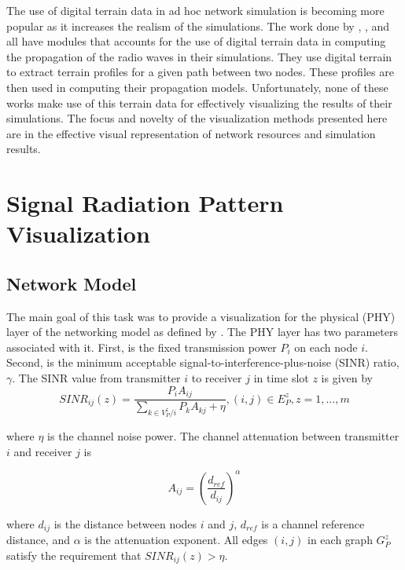 The use of digital terrain data in ad hoc network simulation is becoming more popular as it increases the realism of the simulations.  The work done by \cite{LuiPerNic01}, \cite{BonWanSta98}, and \cite{DzaTraFil07} all have modules that accounts for the use of digital terrain data in computing the propagation of the radio waves in their simulations.  They use digital terrain to extract terrain profiles for a given path between two nodes.  These profiles are then used in computing their propagation models.  Unfortunately, none of these works make use of this terrain data for effectively visualizing the results of their simulations.  The focus and novelty of the visualization methods presented here are in the effective visual representation of network resources and simulation results.


\section{Signal Radiation Pattern Visualization}
\subsection{Network Model}
The main goal of this task was to provide a visualization for the physical (PHY) layer of the networking model as defined by \cite{WuChoQia05}.  The PHY layer has two parameters associated with it.  First, is the fixed transmission power $P_i$ on each node $i$.  Second, is the minimum acceptable signal-to-interference-plus-noise (SINR) ratio, $\gamma$.  The SINR value from transmitter $i$ to receiver $j$ in time slot $z$ is given by
\begin{equation}
SINR_{ij}(z) = \frac{P_i A_{ij}}{\sum_{k \in V_P^z / i} P_k A_{k j} + \eta } , (i, j) \in E_P^z , z = 1,...,m
\end{equation} 

where $\eta$ is the channel noise power.  The channel attenuation between transmitter $i$ and receiver $j$ is 

\begin{equation}
A_{ij} = (\frac{d_{ref}}{d_{ij}})^\alpha
\end{equation}

where $d_{ij}$ is the distance between nodes $i$ and $j$, $d_{ref}$ is a channel reference distance, and $\alpha$ is the attenuation exponent.  All edges $(i,j)$ in each graph $G_P^z$ satisfy the requirement that \begin{math}SINR_{ij}(z) > \eta \end{math}.

